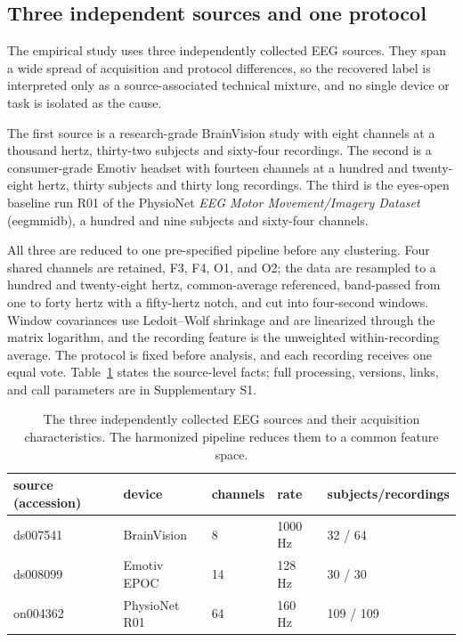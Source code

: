 \subsection{Three independent sources and one
protocol}\label{three-independent-sources-and-one-protocol}

The empirical study uses three independently collected EEG sources. They
span a wide spread of acquisition and protocol differences, so the
recovered label is interpreted only as a source-associated technical
mixture, and no single device or task is isolated as the cause.

The first source is a research-grade BrainVision study with eight
channels at a thousand hertz, thirty-two subjects and sixty-four
recordings. The second is a consumer-grade Emotiv headset with fourteen
channels at a hundred and twenty-eight hertz, thirty subjects and thirty
long recordings. The third is the eyes-open baseline run R01 of the
PhysioNet \emph{EEG Motor Movement/Imagery Dataset} (eegmmidb), a
hundred and nine subjects and sixty-four channels.

All three are reduced to one pre-specified pipeline before any
clustering. Four shared channels are retained, F3, F4, O1, and O2; the
data are resampled to a hundred and twenty-eight hertz, common-average
referenced, band-passed from one to forty hertz with a fifty-hertz
notch, and cut into four-second windows. Window covariances use
Ledoit--Wolf shrinkage and are linearized through the matrix logarithm,
and the recording feature is the unweighted within-recording average.
The protocol is fixed before analysis, and each recording receives one
equal vote. Table~\ref{tab:sources} states the
source-level facts; full processing, versions, links, and call
parameters are in Supplementary S1.

\begin{table}[htbp]
\centering
\small
\caption{The three independently collected EEG sources and their acquisition characteristics. The harmonized pipeline reduces them to a common feature space.}
\label{tab:sources}
\begin{tabular}{lllll}
\hline
source (accession) & device & channels & rate & subjects/recordings\\
\hline
ds007541 & BrainVision & 8 & 1000 Hz & 32 / 64\\
ds008099 & Emotiv EPOC & 14 & 128 Hz & 30 / 30\\
on004362 & PhysioNet R01 & 64 & 160 Hz & 109 / 109\\
\hline
\end{tabular}

\end{table}

